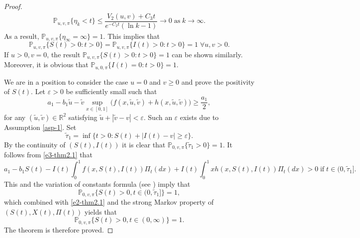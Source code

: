 \documentclass[12pt]{amsart}
\theoremstyle{remark}
\numberwithin{equation}{section}
\newcommand{\eps}{\varepsilon}
\newcommand{\N}{\mathbb{N}}
\newcommand{\PP}{\mathbb{P}}
\newcommand{\R}{\mathbb{R}}
\numberwithin{equation}{section}
\newcommand{\PPi}{\PP_{u,v,\pi}}
\newcommand{\ad}{&\!\!\!\disp}
\newcommand{\aad}{&\disp}
\newcommand{\barray}{\begin{array}{ll}}
\newcommand{\earray}{\end{array}}
\def\disp{\displaystyle}
\newcommand{\1}{\boldsymbol{1}}
\begin{document}
\begin{proof}
\begin{equation*}
\begin{aligned}
\PPi\{\eta_k<t\}\leq \dfrac{ V_2(u,v)+C_3t}{e^{-C_2t}(\ln k-1)}\to 0\;\text{as}\;k\to \infty.
\end{aligned}
\end{equation*}
As a result, $\PPi\{\eta_\infty=\infty\}=1$. This implies that
\begin{equation}\label{e2-thm2.1}
\PPi\big\{S(t)>0: t>0 \big\}=\PPi\big\{I(t)>0: t>0 \big\}=1\;\forall u,v>0.
\end{equation}
If $u>0,v=0$, the result $\PPi\big\{S(t)>0: t>0 \big\}=1$ can be shown similarly. Moreover, it is obvious that $\PP_{u,0,\pi}\big\{I(t)=0: t>0 \big\}=1$.

We are in a position
to consider the case $u=0$ and $ v\geq 0$ and prove the positivity of $S(t)$.
Let $\eps>0$ be sufficiently small such that
\begin{equation}\label{e3-thm2.1}a_1-b_1\tilde u-\tilde v\sup_{x\in[0,1]}\big(f(x,\tilde u,\tilde v)+h(x,\tilde u,\tilde v)\big)\geq \frac{a_1}{2},
\end{equation}
for any $(\tilde u,\tilde v)\in\R^2$ satisfying
$\tilde u+|\tilde v-v|<\eps$.
Such an $\eps$ exists due to Assumption \ref{asp-1}.
Set $$\tilde\tau_1=\inf\{t>0:S(t)+|I(t)-v|\geq\eps\}.$$
By the continuity of $(S(t), I(t))$ it is clear that $\PP_{0,v,\pi}\{\tilde\tau_1>0\}=1$.
It follows
from \eqref{e3-thm2.1} that
$$a_1-b_1S(t)-I(t)\int_0^1f(x,S(t),I(t))\Pi_t(dx)+I(t)\int_0^1xh(x,S(t),I(t))\Pi_t(dx)>0\;\text{if}\;t\in(0,\tilde\tau_1].$$
This and the variation of constants formula (see \cite[Chapter 3]{MAO})
imply that
$$\PP_{0,v,\pi}\{S(t)>0, t\in(0,\tilde\tau_1]\}=1,$$
which combined with \eqref{e2-thm2.1}
and the strong Markov property of $(S(t),X(t),\Pi(t))$
yields that
\begin{equation*}
\PP_{0,v,\pi}\{S(t)>0, t\in(0,\infty)\}=1.
\end{equation*}
The theorem is therefore proved.
\end{proof}
\end{document}

